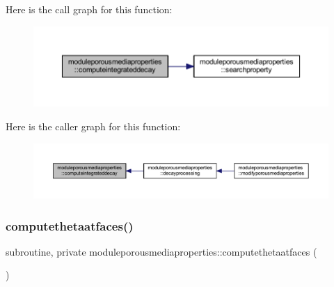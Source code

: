 Here is the call graph for this function\+:\nopagebreak
\begin{figure}[H]
\begin{center}
\leavevmode
\includegraphics[width=350pt]{namespacemoduleporousmediaproperties_a06f48331cb6d7a1d7fa1520565129efc_cgraph}
\end{center}
\end{figure}
Here is the caller graph for this function\+:\nopagebreak
\begin{figure}[H]
\begin{center}
\leavevmode
\includegraphics[width=350pt]{namespacemoduleporousmediaproperties_a06f48331cb6d7a1d7fa1520565129efc_icgraph}
\end{center}
\end{figure}
\mbox{\label{namespacemoduleporousmediaproperties_a534ab2ca9e28f31cfce1876b53c263c8}} 
\subsubsection{\texorpdfstring{computethetaatfaces()}{computethetaatfaces()}}
{\footnotesize\ttfamily subroutine, private moduleporousmediaproperties\+::computethetaatfaces (\begin{DoxyParamCaption}{ }\end{DoxyParamCaption})\hspace{0.3cm}{\ttfamily [private]}}

